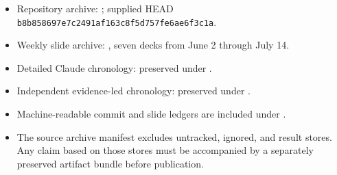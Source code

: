 \documentclass[11pt]{report}
\newcommand{\code}[1]{\texttt{#1}}
\begin{document}
\begin{itemize}
  \item Repository archive: ; supplied HEAD \code{b8b858697e7c2491af163c8f5d757fe6ae6f3c1a}.
  \item Weekly slide archive: , seven decks from June 2 through July 14.
  \item Detailed Claude chronology: preserved under .
  \item Independent evidence-led chronology: preserved under .
  \item Machine-readable commit and slide ledgers are included under .
  \item The source archive manifest excludes untracked, ignored, and 
        result stores. Any claim based on those stores must be accompanied by a
        separately preserved artifact bundle before publication.
\end{itemize}
\end{document}
